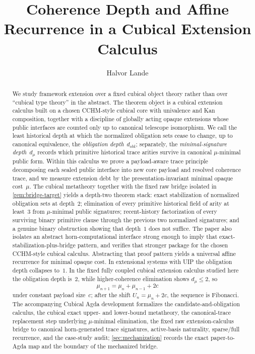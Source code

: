 \documentclass{lmcs}
\title[Coherence Depth and Affine Recurrence]{Coherence Depth and Affine Recurrence in a Cubical Extension Calculus}
\author[H.\ Lande]{Halvor Lande}
\begin{document}
\begin{abstract}
We study framework extension over a fixed cubical object theory rather than over ``cubical type theory'' in the abstract. The theorem object is a cubical extension calculus built on a chosen CCHM-style cubical core with univalence and Kan composition, together with a discipline of globally acting opaque extensions whose public interfaces are counted only up to canonical telescope isomorphism. We call the least historical depth at which the normalized obligation sets cease to change, up to canonical equivalence, the \emph{obligation depth}~$d_{\mathrm{obl}}$; separately, the \emph{minimal-signature depth}~$d_\mu$ records which primitive historical trace arities survive in canonical $\mu$-minimal public form. Within this calculus we prove a payload-aware trace principle decomposing each sealed public interface into new core payload and resolved coherence trace, and we measure extension debt by the presentation-invariant minimal opaque cost~$\mu$. The cubical metatheory together with the fixed raw bridge isolated in \autoref{rem:bridge-target} yields a depth-two theorem stack: exact stabilization of normalized obligation sets at depth~$2$; elimination of every primitive historical field of arity at least~$3$ from $\mu$-minimal public signatures; recent-history factorization of every surviving binary primitive clause through the previous two normalized signatures; and a genuine binary obstruction showing that depth~$1$ does not suffice. The paper also isolates an abstract horn-computational interface strong enough to imply that exact-stabilization-plus-bridge pattern, and verifies that stronger package for the chosen CCHM-style cubical calculus. Abstracting that proof pattern yields a universal affine recurrence for minimal opaque cost. In extensional systems with UIP the obligation depth collapses to~$1$. In the fixed fully coupled cubical extension calculus studied here the obligation depth is~$2$, while higher-coherence elimination shows $d_\mu \leq 2$, so
\[
  \mu_{n+1} = \mu_n + \mu_{n-1} + 2c
\]
under constant payload size~$c$; after the shift $U_n=\mu_n+2c$, the sequence is Fibonacci. The accompanying Cubical Agda development formalizes the candidate-and-obligation calculus, the cubical exact upper- and lower-bound metatheory, the canonical-trace replacement step underlying $\mu$-minimal elimination, the fixed raw extension-calculus bridge to canonical horn-generated trace signatures, active-basis naturality, sparse/full recurrence, and the case-study audit; \autoref{sec:mechanization} records the exact paper-to-Agda map and the boundary of the mechanized bridge.
\end{abstract}
\end{document}
